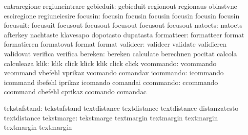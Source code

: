                            entraregione              regiuneintrare
                gebieduit: gebieduit                 regionout
                           regionaus                 oblastvne
                           esciregione               regiuneiesire
                  focusin: focusin                   focusin
                           focusin                   focusin
                           focusin                   focusin
                 focusuit: focusuit                  focusout
                           focusout                  focusout
                           focusout                  focusout
                  natoets: natoets                   afterkey
                           nachtaste                 klavesapo
                           dopotasto                 dupatasta
               formatteer: formatteer                format
                           formatieren               formatovat
                           format                    format %
                 valideer: valideer                  validate
                           validieren                validovat
                           verifica                  verifica
                  bereken: bereken                   calculate
                           berechnen                 pocitat
                           calcola                   calculeaza
                     klik: klik                      click
                           klick                     klik
                           click                     click
                vcommando: vcommando                 vcommand
                           vbefehl                   vprikaz
                           vcomando                  comandav
                icommando: icommando                 icommand
                           ibefehl                   iprikaz
                           icomando                  comandai
                ccommando: ccommando                 ccommand
                           cbefehl                   cprikaz
                           ccomando                  comandac

             tekstafstand: tekstafstand              textdistance 
                           textdistance              textdistance 
                           distanzatesto             textdistance %
               tekstmarge: tekstmarge                textmargin
                           textmargin                textmargin
                           textmargin                textmargin   %

